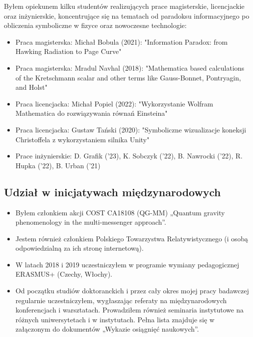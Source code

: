 \documentclass[12pt,a4paper]{article}
\begin{document}
Byłem opiekunem kilku studentów realizujących prace magisterskie, licencjackie oraz inżynierskie, koncentrujące się na tematach od paradoksu informacyjnego po obliczenia symboliczne w fizyce oraz nowoczesne technologie:
\begin{itemize}
	\item Praca magisterska: Michał Bobula (2021): "Information Paradox: from Hawking Radiation to Page Curve"
	\item Praca magisterska: Mradul Navhal (2018): "Mathematica based calculations of the Kretschmann scalar and other terms like Gauss-Bonnet, Pontryagin, and Holst"
	\item Praca licencjacka: Michał Popiel (2022): "Wykorzystanie Wolfram Mathematica do rozwiązywania równań Einsteina"
	\item Praca licencjacka: Gustaw Tański (2020): "Symboliczne wizualizacje koneksji Christoffela z wykorzystaniem silnika Unity"
	\item Prace inżynierskie: D. Grafik ('23), K. Sobczyk ('22), B. Nawrocki ('22), R. Hupka ('22), B. Urban ('21)
\end{itemize}


\subsection*{Udział w inicjatywach międzynarodowych}

\begin{itemize}
	\item Byłem członkiem akcji COST CA18108 (QG-MM) „Quantum gravity phenomenology in the multi-messenger approach”.
	\item Jestem również członkiem Polskiego Towarzystwa Relatywistycznego (i osobą odpowiedzialną za ich stronę internetową).
	\item W latach 2018 i 2019 uczestniczyłem w programie wymiany pedagogicznej ERASMUS+ (Czechy, Włochy).
	\item Od początku studiów doktoranckich i przez cały okres mojej pracy badawczej regularnie uczestniczyłem, wygłaszając referaty na międzynarodowych konferencjach i warsztatach. Prowadziłem również seminaria instytutowe na różnych uniwersytetach i w instytutach. Pełna lista znajduje się w załączonym do dokumentów „Wykazie osiągnięć naukowych”.
\end{itemize}

\end{document}
